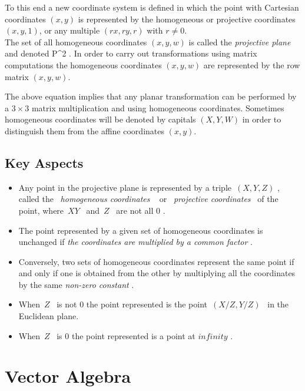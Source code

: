 \documentclass[12pt]{report}
\begin{document}
To this end a new coordinate system is defined in which the point with Cartesian coordinates $(x , y)$ is represented by the homogeneous or projective coordinates $( x , y , 1 )$, or any multiple $( rx , ry , r )$ with $ r \neq 0 $.
\\
\vspace{.5cm}
The set of all homogeneous coordinates $(x , y , w)$ is called the \textit{projective plane} and denoted P^2 . In order to carry out transformations using matrix computations the homogeneous coordinates $( x, y, w )$ are represented by the row matrix $(x, y, w)$. 
\\
\vspace{.5cm}

\hspace{1cm} The above equation implies that any planar transformation can be performed by a $ 3 × 3 $ matrix multiplication and using homogeneous coordinates. Sometimes homogeneous coordinates will be denoted by capitals $ (X, Y, W) $  in order to distinguish them from the affine coordinates $(x, y)$.


\subsection{Key Aspects}
\begin{itemize}
  \item 
  Any point in the projective plane is represented by a triple $ (X, Y, Z) $ , called the \textit{ homogeneous coordinates }  or \textit{ projective coordinates } of the point, where $ X Y$  and $ Z$  are not all $ 0$ .
  \item 
  The point represented by a given set of homogeneous coordinates is unchanged if \textit{  the coordinates are multiplied by a common factor }.
  \item 
  Conversely, two sets of homogeneous coordinates represent the same point if and only if one is obtained from the other by multiplying all the coordinates by the same  \textit{ non-zero constant }.
  \item 
  When $ Z $  is not $ 0$  the point represented is the point $ (X/Z, Y/Z)$  in the Euclidean plane.
  \item 
  When $ Z $  is $ 0$  the point represented is a point at $ infinity $ .
\end{itemize}

\section{Vector Algebra}
\end{document}
